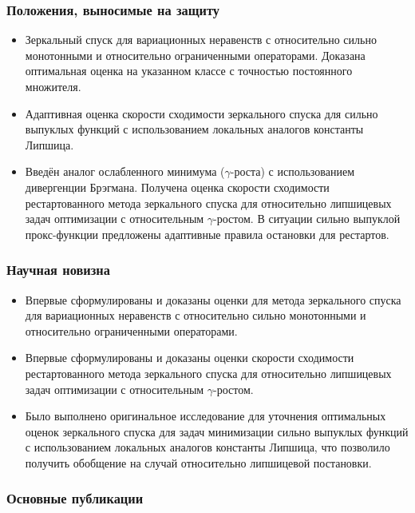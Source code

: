 \begin{frame}
    \frametitle{Положения, выносимые на защиту}
    \begin{itemize}
        \item Зеркальный спуск для вариационных неравенств с относительно сильно монотонными и относительно ограниченными операторами. Доказана оптимальная оценка на указанном классе с точностью  постоянного множителя.
        \item Адаптивная оценка скорости сходимости зеркального спуска для сильно выпуклых функций с использованием локальных аналогов константы Липшица. 
        \item Введён аналог ослабленного минимума ($\gamma$-роста) с использованием дивергенции Брэгмана. Получена оценка скорости сходимости рестартованного метода зеркального спуска для относительно липшицевых задач оптимизации с относительным $\gamma$-ростом. В ситуации сильно выпуклой прокс-функции предложены адаптивные правила остановки для рестартов.
    \end{itemize}
\end{frame}

\begin{frame}
    \frametitle{Научная новизна}
    \begin{itemize}
        \item Впервые сформулированы и доказаны оценки для метода зеркального спуска для вариационных неравенств с относительно сильно монотонными и относительно ограниченными операторами.
        \item Впервые сформулированы и доказаны оценки скорости сходимости рестартованного метода зеркального спуска для относительно липшицевых задач оптимизации с относительным $\gamma$-ростом.
        \item Было выполнено оригинальное исследование для уточнения оптимальных оценок зеркального спуска для задач минимизации сильно выпуклых функций с использованием локальных аналогов константы Липшица, что позволило получить обобщение на случай относительно липшицевой постановки.
    \end{itemize}
\end{frame}

\begin{frame} %
    \frametitle{Основные публикации}
    \nocite{GorbunovKMR20}
    \nocite{yakovlev2019algorithms}
    \nocite{Stonyakin_2021}
    \nocite{sharp22}
\end{frame}

